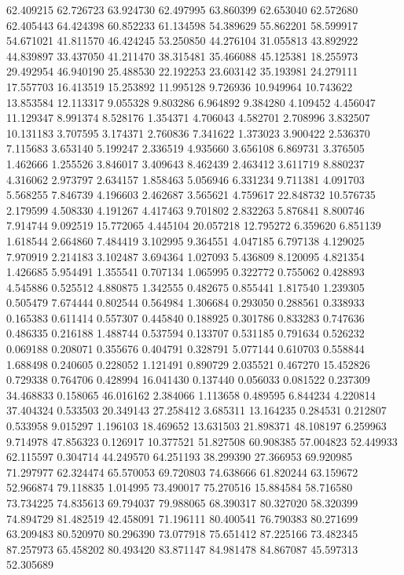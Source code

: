 62.409215
62.726723
63.924730
62.497995
63.860399
62.653040
62.572680
62.405443
64.424398
60.852233
61.134598
54.389629
55.862201
58.599917
54.671021
41.811570
46.424245
53.250850
44.276104
31.055813
43.892922
44.839897
33.437050
41.211470
38.315481
35.466088
45.125381
18.255973
29.492954
46.940190
25.488530
22.192253
23.603142
35.193981
24.279111
17.557703
16.413519
15.253892
11.995128
9.726936
10.949964
10.743622
13.853584
12.113317
9.055328
9.803286
6.964892
9.384280
4.109452
4.456047
11.129347
8.991374
8.528176
1.354371
4.706043
4.582701
2.708996
3.832507
10.131183
3.707595
3.174371
2.760836
7.341622
1.373023
3.900422
2.536370
7.115683
3.653140
5.199247
2.336519
4.935660
3.656108
6.869731
3.376505
1.462666
1.255526
3.846017
3.409643
8.462439
2.463412
3.611719
8.880237
4.316062
2.973797
2.634157
1.858463
5.056946
6.331234
9.711381
4.091703
5.568255
7.846739
4.196603
2.462687
3.565621
4.759617
22.848732
10.576735
2.179599
4.508330
4.191267
4.417463
9.701802
2.832263
5.876841
8.800746
7.914744
9.092519
15.772065
4.445104
20.057218
12.795272
6.359620
6.851139
1.618544
2.664860
7.484419
3.102995
9.364551
4.047185
6.797138
4.129025
7.970919
2.214183
3.102487
3.694364
1.027093
5.436809
8.120095
4.821354
1.426685
5.954491
1.355541
0.707134
1.065995
0.322772
0.755062
0.428893
4.545886
0.525512
4.880875
1.342555
0.482675
0.855441
1.817540
1.239305
0.505479
7.674444
0.802544
0.564984
1.306684
0.293050
0.288561
0.338933
0.165383
0.611414
0.557307
0.445840
0.188925
0.301786
0.833283
0.747636
0.486335
0.216188
1.488744
0.537594
0.133707
0.531185
0.791634
0.526232
0.069188
0.208071
0.355676
0.404791
0.328791
5.077144
0.610703
0.558844
1.688498
0.240605
0.228052
1.121491
0.890729
2.035521
0.467270
15.452826
0.729338
0.764706
0.428994
16.041430
0.137440
0.056033
0.081522
0.237309
34.468833
0.158065
46.016162
2.384066
1.113658
0.489595
6.844234
4.220814
37.404324
0.533503
20.349143
27.258412
3.685311
13.164235
0.284531
0.212807
0.533958
9.015297
1.196103
18.469652
13.631503
21.898371
48.108197
6.259963
9.714978
47.856323
0.126917
10.377521
51.827508
60.908385
57.004823
52.449933
62.115597
0.304714
44.249570
64.251193
38.299390
27.366953
69.920985
71.297977
62.324474
65.570053
69.720803
74.638666
61.820244
63.159672
52.966874
79.118835
1.014995
73.490017
75.270516
15.884584
58.716580
73.734225
74.835613
69.794037
79.988065
68.390317
80.327020
58.320399
74.894729
81.482519
42.458091
71.196111
80.400541
76.790383
80.271699
63.209483
80.520970
80.296390
73.077918
75.651412
87.225166
73.482345
87.257973
65.458202
80.493420
83.871147
84.981478
84.867087
45.597313
52.305689
